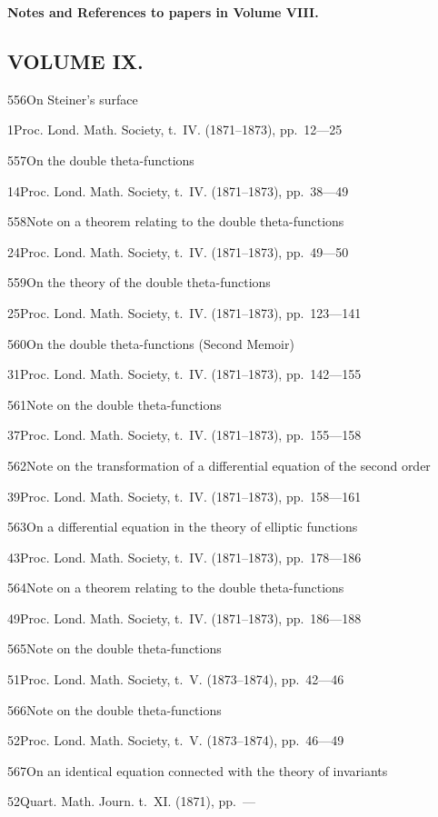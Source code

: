 \documentclass[11pt,a4paper]{book}
\providecommand{\tocentry}[2]{#1\dotfill #2\par}
\begin{document}
\vspace{1cm}
\noindent\textbf{Notes and References to papers in Volume VIII.} 

\newpage

\subsection*{VOLUME IX.}

\tocentry{556}{On Steiner's surface}{1}{Proc. Lond. Math. Society, t.~IV. (1871--1873), pp.~12---25}

\tocentry{557}{On the double theta-functions}{14}{Proc. Lond. Math. Society, t.~IV. (1871--1873), pp.~38---49}

\tocentry{558}{Note on a theorem relating to the double theta-functions}{24}{Proc. Lond. Math. Society, t.~IV. (1871--1873), pp.~49---50}

\tocentry{559}{On the theory of the double theta-functions}{25}{Proc. Lond. Math. Society, t.~IV. (1871--1873), pp.~123---141}

\tocentry{560}{On the double theta-functions (Second Memoir)}{31}{Proc. Lond. Math. Society, t.~IV. (1871--1873), pp.~142---155}

\tocentry{561}{Note on the double theta-functions}{37}{Proc. Lond. Math. Society, t.~IV. (1871--1873), pp.~155---158}

\tocentry{562}{Note on the transformation of a differential equation of the second order}{39}{Proc. Lond. Math. Society, t.~IV. (1871--1873), pp.~158---161}

\newpage

\tocentry{563}{On a differential equation in the theory of elliptic functions}{43}{Proc. Lond. Math. Society, t.~IV. (1871--1873), pp.~178---186}

\tocentry{564}{Note on a theorem relating to the double theta-functions}{49}{Proc. Lond. Math. Society, t.~IV. (1871--1873), pp.~186---188}

\tocentry{565}{Note on the double theta-functions}{51}{Proc. Lond. Math. Society, t.~V. (1873--1874), pp.~42---46}

\tocentry{566}{Note on the double theta-functions}{52}{Proc. Lond. Math. Society, t.~V. (1873--1874), pp.~46---49}

\tocentry{567}{On an identical equation connected with the theory of invariants}{52}{Quart. Math. Journ. t.~XI. (1871), pp.~---}
\end{document}
